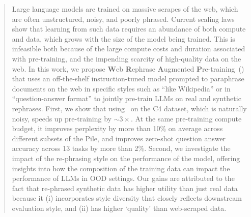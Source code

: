 \begin{abstract}
    Large language models are trained on massive scrapes of the web, which are often unstructured, noisy, and poorly phrased. 
    Current scaling laws show that learning from such data requires an abundance of both compute and data, which grows with the size of the model being trained. 
     This is infeasible both because of the large compute costs and duration associated with pre-training, and the impending scarcity of high-quality data on the web.  
    In this work, we propose \textbf{W}eb \textbf{R}ephrase \textbf{A}ugmented \textbf{P}re-training~(\ours) that uses an off-the-shelf instruction-tuned model prompted to paraphrase documents on the web in specific styles such as ``like Wikipedia'' or in ``question-answer format'' to jointly pre-train LLMs on real and synthetic rephrases. First,  we show that using \ours~on the C4 dataset, which is naturally noisy, 
    speeds up pre-training by $\sim3\times$. At the same pre-training compute budget, it
    improves perplexity by more than 10\% on average across different subsets of the Pile, and improves zero-shot question answer accuracy across 13 tasks by more than 2\%. Second, we investigate the impact of the re-phrasing style on the performance of the model, offering insights into how the composition of the training data can impact the performance of LLMs in OOD settings. Our gains are attributed to the fact that re-phrased synthetic data has higher utility than just real data because it (i) incorporates style diversity that closely reflects downstream evaluation style, and (ii) has higher `quality' than web-scraped data.
    
    
    
\end{abstract}

